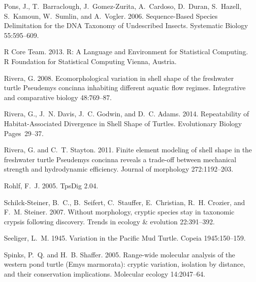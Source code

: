\documentclass[12pt,letterpaper]{article}
\begin{document}
\begin{thebibliography}{77}
Pons, J., T.~Barraclough, J.~Gomez-Zurita, A.~Cardoso, D.~Duran, S.~Hazell,
  S.~Kamoun, W.~Sumlin, and A.~Vogler. 2006. {Sequence-Based Species
  Delimitation for the DNA Taxonomy of Undescribed Insects}. Systematic Biology
  55:595--609.

{R Core Team}. 2013. R: A Language and Environment for Statistical Computing. R
  Foundation for Statistical Computing Vienna, Austria.

Rivera, G. 2008. {Ecomorphological variation in shell shape of the freshwater
  turtle Pseudemys concinna inhabiting different aquatic flow regimes.}
  Integrative and comparative biology 48:769--87.

Rivera, G., J.~N. Davis, J.~C. Godwin, and D.~C. Adams. 2014. {Repeatability of
  Habitat-Associated Divergence in Shell Shape of Turtles}. Evolutionary
  Biology Pages~29--37.

Rivera, G. and C.~T. Stayton. 2011. {Finite element modeling of shell shape in
  the freshwater turtle Pseudemys concinna reveals a trade-off between
  mechanical strength and hydrodynamic efficiency.} Journal of morphology
  272:1192--203.

Rohlf, F.~J. 2005. {TpsDig 2.04}.

Schilck-Steiner, B.~C., B.~Seifert, C.~Stauffer, E.~Christian, R.~H. Crozier,
  and F.~M. Steiner. 2007. {Without morphology, cryptic species stay in
  taxonomic crypsis following discovery}. Trends in ecology \& evolution
  22:391--392.

Seeliger, L.~M. 1945. {Variation in the Pacific Mud Turtle}. Copeia
  1945:150--159.

Spinks, P.~Q. and H.~B. Shaffer. 2005. {Range-wide molecular analysis of the
  western pond turtle (Emys marmorata): cryptic variation, isolation by
  distance, and their conservation implications.} Molecular ecology
  14:2047--64.


\end{thebibliography}
\end{document}
